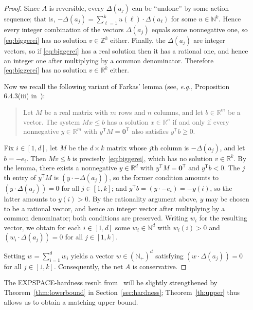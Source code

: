 \documentclass[11pt,a4paper]{amsart}
\newcommand{\transp}{\mathsf{T}}
\newcommand{\Nat}{\mathbb{N}}
\newcommand{\Zset}{\mathbb{Z}}
\newcommand{\setN}{\Nat}
\newcommand{\setZ}{\Zset}
\newcommand{\setR}{\mathbb{R}}
\newcommand{\scalar}[2]{(#1 \cdot #2)}
\def\eg{{\em e.g.}}
\theoremstyle{plain}
\theoremstyle{definition}
\theoremstyle{defC}
\theoremstyle{thmC}
\begin{document}
\begin{proof}
Since $A$ is reversible, every $\Delta(a_j)$ can be ``undone'' by
	some action sequence; that is, $-\Delta(a_j)=\sum_{\ell=1}^k
	u(\ell)\cdot\Delta(a_\ell)$ for some $u\in\setN^k$.
Hence every integer combination of the vectors $\Delta(a_j)$ equals some
	nonnegative one, so \eqref{eq:biggerei} has no solution
	$v\in\setZ^k$ either.
	Finally, the $\Delta(a_j)$ are integer vectors, so if
	\eqref{eq:biggerei} has a real solution then it has a rational one,
	and hence an integer one after multiplying by a common denominator.
	Therefore \eqref{eq:biggerei} has no solution $v\in\setR^k$ either.

Now we recall the following variant of Farkas' lemma 
(see, \eg, Proposition 6.4.3(iii)
in~\cite{DBLP:books/daglib/0016926}):
\begin{quote}
	Let $M$ be a real matrix with $m$ rows and $n$ columns, and let
	$b \in \setR^m$ be a vector.
	The system $Mx \leq b$ has a solution $x \in \setR^n$ if and only if
	every nonnegative $y \in \setR^m$ with $y^{\transp} M =
	\mathbf{0}^{\transp}$ also satisfies $y^{\transp} b \geq 0$.
\end{quote}
Fix $i\in[1,d]$, let $M$ be the $d\times k$ matrix whose $j$th column
is $-\Delta(a_j)$, and let $b=-e_i$.  Then $Mv\leq b$ is
precisely~\eqref{eq:biggerei}, which has no solution $v\in\setR^k$.
By the lemma, there exists a nonnegative
$y\in\setR^d$ with $y^{\transp}M=\mathbf{0}^{\transp}$ and
$y^{\transp}b<0$.  The $j$th entry of $y^{\transp}M$ is
$\scalar{y}{-\Delta(a_j)}$, so the former condition amounts to
$\scalar{y}{\Delta(a_j)}=0$ for all $j\in[1,k]$; and
$y^{\transp}b=\scalar{y}{-e_i}=-y(i)$, so the latter amounts to
$y(i)>0$.
By the rationality argument above, $y$ may be chosen to be a rational
vector, and hence an integer vector after multiplying by a common
denominator; both conditions are preserved.
Writing $w_i$ for the resulting vector, we
obtain for each $i\in[1,d]$ some $w_i\in\setN^d$ with $w_i(i)>0$ and
$\scalar{w_i}{\Delta(a_j)}=0$ for all $j\in[1,k]$.

	Setting $w=\sum_{i=1}^d w_i$ yields a vector $w\in(\setN_+)^d$
	satisfying $\scalar{w}{\Delta(a_j)}=0$ for all $j\in[1,k]$.
	Consequently, the net $A$ is conservative.
\end{proof}


\noindent
The EXPSPACE-hardness result  
from~\cite{DBLP:journals/acta/JancarP19} will be slightly
strengthened by Theorem~\ref{thm:lowerbound} in
Section~\ref{sec:hardness}; Theorem~\ref{th:upper} thus allows us to
obtain a matching
upper bound.
\end{document}
